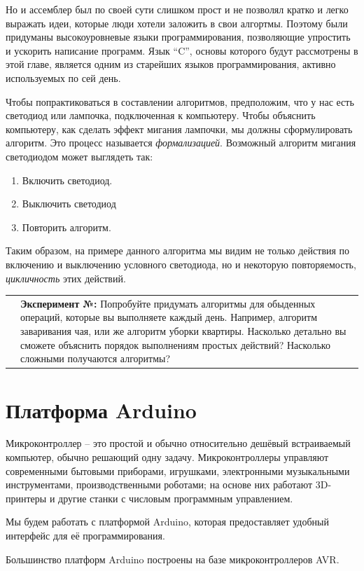 \documentclass[a4paper,twoside]{book}
\newcounter{experiment-counter}
\newcommand{\experiment}[2]{
  \vspace{8pt}
  \begin{tabularx}{\textwidth}{m{1cm} m{9cm}}
    
    & \textbf{Эксперимент №\arabic{experiment-counter}:} #2 \\
  \end{tabularx}
  \addtocounter{experiment-counter}{1}
}
\begin{document}
Но и ассемблер был по своей сути слишком прост и не позволял кратко и легко
выражать идеи, которые люди хотели заложить в свои алгортмы.  Поэтому были
придуманы высокоуровневые языки программирования, позволяющие упростить и
ускорить написание программ.  Язык ``C'', основы которого будут рассмотрены в
этой главе, является одним из старейших языков программирования, активно
используемых по сей день.

Чтобы попрактиковаться в составлении алгоритмов, предположим, что у нас есть
светодиод или лампочка, подключенная к компьютеру.  Чтобы объяснить компьютеру,
как сделать эффект мигания лампочки, мы должны сформулировать алгоритм.  Это
процесс называется \emph{формализацией}.  Возможный алгоритм мигания светодиодом
может выглядеть так:

\begin{enumerate}
\item Включить светодиод.
\item Выключить светодиод
\item Повторить алгоритм.
\end{enumerate}

Таким образом, на примере данного алгоритма мы видим не только действия по
включению и выключению условного светодиода, но и некоторую повторяемость,
\emph{цикличность} этих действий.

\experiment{0} { Попробуйте придумать алгоритмы для обыденных операций, которые
  вы выполняете каждый день.  Например, алгоритм заваривания чая, или же
  алгоритм уборки квартиры.  Насколько детально вы сможете объяснить порядок
  выполнениям простых действий?  Насколько сложными получаются алгоритмы?}

\section{Платформа Arduino}

Микроконтроллер -- это простой и обычно относительно дешёвый встраиваемый
компьютер, обычно решающий одну задачу.  Микроконтроллеры управляют современными
бытовыми приборами, игрушками, электронными музыкальными инструментами,
производственными роботами; на основе них работают 3D-принтеры и другие станки с
числовым программным управлением.

Мы будем работать с платформой Arduino, которая предоставляет удобный интерфейс
для её программирования.

Большинство платформ Arduino построены на базе микроконтроллеров AVR.
\end{document}
